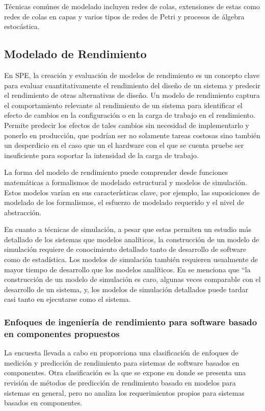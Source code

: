 \documentclass[11pt, twoside]{report}
\begin{document}
Técnicas comúnes de modelado incluyen redes de colas, extensiones de estas como redes de colas en capas y varios tipos de redes de Petri y procesos de álgebra estocástica.


\subsection{Modelado de Rendimiento}
En SPE, la creación y evaluación de modelos de rendimiento es un concepto clave para evaluar cuantitativamente el rendimiento del diseño de un sistema y predecir el rendimiento de otras alternativas de diseño. Un modelo de rendimiento captura el comportamiento relevante al rendimiento de un sistema para identificar el efecto de cambios en la configuración o en la carga de trabajo en el rendimiento. Permite predecir los efectos de tales cambios sin necesidad de implementarlo y ponerlo en producción, que podrían ser no solamente tareas costosas sino también un desperdicio en el caso que un el hardware con el que se cuenta pruebe ser insuficiente para soportar la intensidad de la carga de trabajo.\cite{noorshams}

La forma del modelo de rendimiento puede comprender desde funciones matemáticas a formalismos de modelado estructural y modelos de simulación. Estos modelos varían en sus características clave, por ejemplo, las suposiciones de modelado de los formalismos, el esfuerzo de modelado requerido y el nivel de abstracción.

En cuanto a técnicas de simulación, a pesar que estas permiten un estudio más detallado de los sistemas que modelos analíticos, la construcción de un modelo de simulación requiere de conocimiento detallado tanto de desarrollo de software como de estadística\cite{thijmen-thesis}. Los modelos de simulación también requieren usualmente de mayor tiempo de desarrollo que los modelos analíticos. En \cite{woodside-et-al} se menciona que ``la construcción de un modelo de simulación es caro, algunas veces comparable con el desarrollo de un sistema, y, los modelos de simulación detallados puede tardar casi tanto en ejecutarse como el sistema.

\subsubsection{Enfoques de ingeniería de rendimiento para software basado en componentes propuestos}
La encuesta llevada a cabo en \cite{performance-model-survey} proporciona una clasificación de enfoques de medición y predicción de rendimiento para sistemas de software basados en componentes. Otra clasificación es la que se expone en \cite{balsamo-et-al} donde se presenta una revisión de métodos de predicción de rendimiento basado en modelos para sistemas en general, pero no analiza los requerimientos propios para sistemas basados en componentes. 
\end{document}
